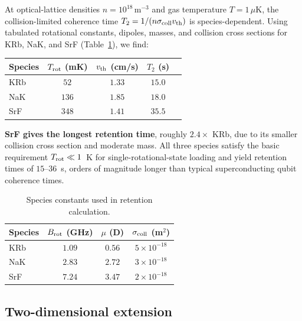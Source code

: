 \documentclass[11pt]{article}
\begin{document}
At optical-lattice densities $n = 10^{18}\,\mathrm{m}^{-3}$ and gas
temperature $T = 1\,\mu\mathrm K$, the collision-limited coherence time
$T_2 = 1/(n\sigma_{\rm coll} v_{\rm th})$ is species-dependent. Using
tabulated rotational constants, dipoles, masses, and collision cross
sections for KRb, NaK, and SrF (Table~\ref{tab:species}), we find:
\begin{center}
\begin{tabular}{lcccc}
\toprule
Species & $T_{\rm rot}$ (mK) & $v_{\rm th}$ (cm/s) & $T_2$ (s) \\
\midrule
KRb & $52$  & $1.33$ & $15.0$ \\
NaK & $136$ & $1.85$ & $18.0$ \\
SrF & $348$ & $1.41$ & $\mathbf{35.5}$ \\
\bottomrule
\end{tabular}
\end{center}
\noindent
\textbf{SrF gives the longest retention time}, roughly $2.4\times$
KRb, due to its smaller collision cross section and moderate mass.
All three species satisfy the basic requirement $T_{\rm rot}\ll 1$~K
for single-rotational-state loading and yield retention times of
$15$--$36$~s, orders of magnitude longer than typical superconducting
qubit coherence times.

\begin{table}[t]
\centering
\small
\caption{Species constants used in retention calculation.}
\label{tab:species}
\begin{tabular}{lccc}
\toprule
Species & $B_{\rm rot}$ (GHz) & $\mu$ (D) & $\sigma_{\rm coll}$ (m$^2$) \\
\midrule
KRb & $1.09$ & $0.56$ & $5\times 10^{-18}$ \\
NaK & $2.83$ & $2.72$ & $3\times 10^{-18}$ \\
SrF & $7.24$ & $3.47$ & $2\times 10^{-18}$ \\
\bottomrule
\end{tabular}
\end{table}

\subsection{Two-dimensional extension}
\label{sec:2d}
\end{document}
